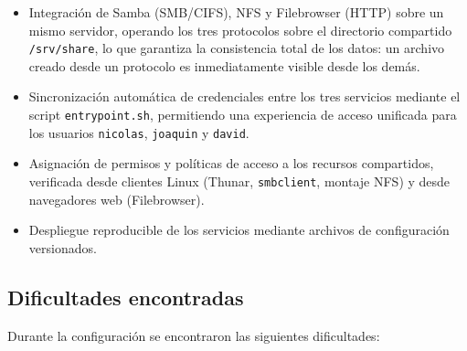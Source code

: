 \begin{itemize}
  \item Integración de Samba (SMB/CIFS), NFS y Filebrowser (HTTP) sobre un
        mismo servidor, operando los tres protocolos sobre el directorio
        compartido \texttt{/srv/share}, lo que garantiza la consistencia total
        de los datos: un archivo creado desde un protocolo es inmediatamente
        visible desde los demás.
  \item Sincronización automática de credenciales entre los tres servicios
        mediante el script \texttt{entrypoint.sh}, permitiendo una experiencia
        de acceso unificada para los usuarios \texttt{nicolas},
        \texttt{joaquin} y \texttt{david}.
  \item Asignación de permisos y políticas de acceso a los recursos
        compartidos, verificada desde clientes Linux (Thunar, \texttt{smbclient},
        montaje NFS) y desde navegadores web (Filebrowser).
  \item Despliegue reproducible de los servicios mediante archivos de
        configuración versionados.
\end{itemize}

\subsection{Dificultades encontradas}

Durante la configuración se encontraron las siguientes dificultades:

